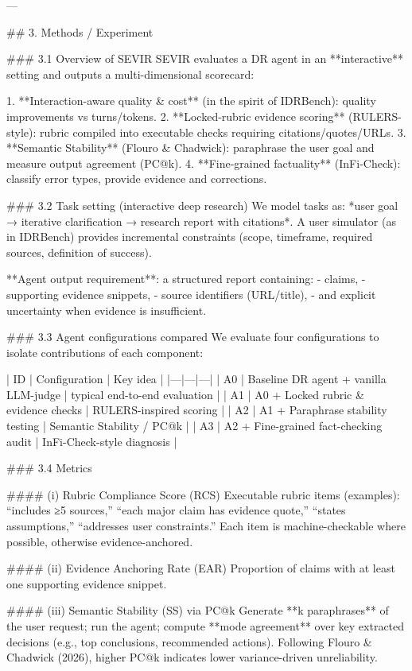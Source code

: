 ---

## 3. Methods / Experiment  

### 3.1 Overview of SEVIR  
SEVIR evaluates a DR agent in an **interactive** setting and outputs a multi-dimensional scorecard:

1. **Interaction-aware quality & cost** (in the spirit of IDRBench): quality improvements vs turns/tokens.  
2. **Locked-rubric evidence scoring** (RULERS-style): rubric compiled into executable checks requiring citations/quotes/URLs.  
3. **Semantic Stability** (Flouro & Chadwick): paraphrase the user goal and measure output agreement (PC@k).  
4. **Fine-grained factuality** (InFi-Check): classify error types, provide evidence and corrections.

### 3.2 Task setting (interactive deep research)  
We model tasks as: *user goal → iterative clarification → research report with citations*. A user simulator (as in IDRBench) provides incremental constraints (scope, timeframe, required sources, definition of success).

**Agent output requirement**: a structured report containing:
- claims,
- supporting evidence snippets,
- source identifiers (URL/title),
- and explicit uncertainty when evidence is insufficient.

### 3.3 Agent configurations compared  
We evaluate four configurations to isolate contributions of each component:

| ID | Configuration | Key idea |
|---|---|---|
| A0 | Baseline DR agent + vanilla LLM-judge | typical end-to-end evaluation |
| A1 | A0 + Locked rubric & evidence checks | RULERS-inspired scoring |
| A2 | A1 + Paraphrase stability testing | Semantic Stability / PC@k |
| A3 | A2 + Fine-grained fact-checking audit | InFi-Check-style diagnosis |

### 3.4 Metrics  

#### (i) Rubric Compliance Score (RCS)  
Executable rubric items (examples): “includes ≥5 sources,” “each major claim has evidence quote,” “states assumptions,” “addresses user constraints.” Each item is machine-checkable where possible, otherwise evidence-anchored.

#### (ii) Evidence Anchoring Rate (EAR)  
Proportion of claims with at least one supporting evidence snippet.

#### (iii) Semantic Stability (SS) via PC@k  
Generate **k paraphrases** of the user request; run the agent; compute **mode agreement** over key extracted decisions (e.g., top conclusions, recommended actions). Following Flouro & Chadwick (2026), higher PC@k indicates lower variance-driven unreliability.

